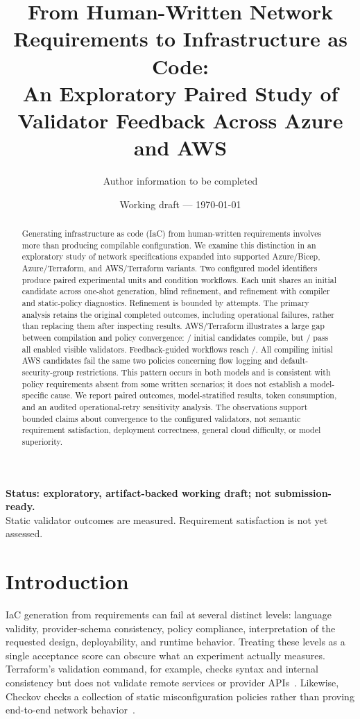 \documentclass[11pt]{article}
\title{From Human-Written Network Requirements to Infrastructure as Code:\\
An Exploratory Paired Study of Validator Feedback Across Azure and AWS}
\author{Author information to be completed}
\date{Working draft --- \today}
\begin{document}
\maketitle
\begin{center}
\small\textbf{Status: exploratory, artifact-backed working draft; not submission-ready.}\\
Static validator outcomes are measured. Requirement satisfaction is not yet assessed.
\end{center}

\begin{abstract}
Generating infrastructure as code (IaC) from human-written requirements involves
more than producing compilable configuration. We examine this distinction in an
exploratory study of \SpecificationCount{} network specifications expanded into
\VariantCount{} supported Azure/Bicep, Azure/Terraform, and AWS/Terraform variants.
Two configured model identifiers produce \PrimaryUnits{} paired experimental units
and \PrimaryWorkflows{} condition workflows. Each unit shares an initial candidate
across one-shot generation, blind refinement, and refinement with compiler and
static-policy diagnostics. Refinement is bounded by \IterationBudget{} attempts.
The primary analysis retains the original completed outcomes, including operational
failures, rather than replacing them after inspecting results.
AWS/Terraform illustrates a large gap between compilation and policy convergence:
\AWSInitialCompiled{}/\AWSInitialUnits{} initial candidates compile, but
\AWSInitialPassed{}/\AWSInitialUnits{} pass all enabled visible validators.
Feedback-guided workflows reach \AWSFeedbackPassed{}/\AWSFeedbackUnits{}.
All compiling initial AWS candidates fail the same two policies concerning flow
logging and default-security-group restrictions. This pattern occurs in both models
and is consistent with policy requirements absent from some written scenarios;
it does not establish a model-specific cause. We report paired outcomes,
model-stratified results, token consumption, and an audited operational-retry
sensitivity analysis. The observations support bounded claims about convergence
to the configured validators, not semantic requirement satisfaction, deployment
correctness, general cloud difficulty, or model superiority.
\end{abstract}

\section{Introduction}
IaC generation from requirements can fail at several distinct levels: language
validity, provider-schema consistency, policy compliance, interpretation of the
requested design, deployability, and runtime behavior. Treating these levels as a
single acceptance score can obscure what an experiment actually measures.
Terraform's validation command, for example, checks syntax and internal consistency
but does not validate remote services or provider APIs~\cite{terraformvalidate}.
Likewise, Checkov checks a collection of static misconfiguration policies rather
than proving end-to-end network behavior~\cite{checkov}.
\end{document}
